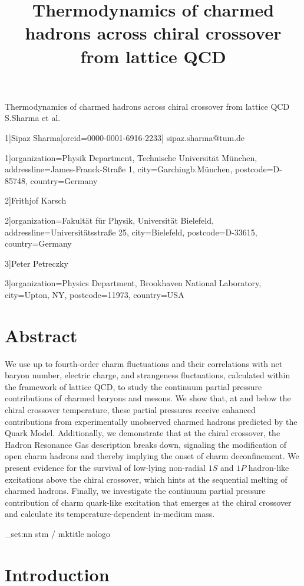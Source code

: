 \documentclass[11pt,a4paper]{article}
\title{Thermodynamics of charmed hadrons across chiral crossover  from lattice QCD}
\begin{document}
\maketitle

Thermodynamics of charmed hadrons across chiral crossover from lattice QCD S.Sharma et al.

1]Sipaz Sharma[orcid=0000-0001-6916-2233] sipaz.sharma@tum.de

1]organization=Physik Department, Technische Universität München, addressline=James-Franck-Straße 1, city=Garchingb.München, postcode=D-85748, country=Germany

2]Frithjof Karsch

2]organization=Fakultät für Physik, Universität Bielefeld, addressline=Universitätsstraße 25, city=Bielefeld, postcode=D-33615, country=Germany

3]Peter Petreczky

3]organization=Physics Department, Brookhaven National Laboratory, city=Upton, NY, postcode=11973, country=USA

\section{Abstract}

We use up to fourth-order charm fluctuations and their correlations with net baryon number, electric charge, and strangeness fluctuations, calculated within the framework of lattice QCD, to study the continuum partial pressure contributions of charmed baryons and mesons. We show that, at and below the chiral crossover temperature, these partial pressures receive enhanced contributions from experimentally unobserved charmed hadrons predicted by the Quark Model. Additionally, we demonstrate that at the chiral crossover, the Hadron Resonance Gas description breaks down, signaling the modification of open charm hadrons and thereby implying the onset of charm deconfinement. We present evidence for the survival of low-lying non-radial  $1S$  and  $1P$  hadron-like excitations above the chiral crossover, which hints at the sequential melting of charmed hadrons. Finally, we investigate the continuum partial pressure contribution of charm quark-like excitation that emerges at the chiral crossover and calculate its temperature-dependent in-medium mass.

\_set:nn stm / mktitle nologo

\section{Introduction}
\end{document}
